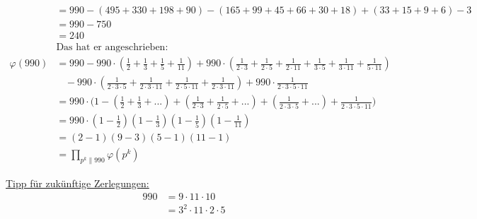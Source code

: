 \documentclass{article} %
\begin{document}
\begin{enumerate}
\begin{mybox}
\begin{align*}
            & = 990 - (495+330+198+90) - (165+99+45+66+30+18)+ (33+15+9+6) - 3 \\
            & = 990 - 750 \\ 
            & = 240 \\
            & \text{Das hat er angeschrieben: }\\
            \varphi(990) & = 990 - 990 \cdot(\frac{1}{2}+\frac{1}{3}+\frac{1}{5}+\frac{1}{11}) + 990 \cdot (\frac{1}{2 \cdot 3}+\frac{1}{2 \cdot 5}+\frac{1}{2 \cdot 11}+\frac{1}{3 \cdot 5}+\frac{1}{3 \cdot 11}+\frac{1}{5 \cdot 11}) \\ & \ \ \ \ - 990 \cdot (\frac{1}{2 \cdot 3 \cdot 5} + \frac{1}{2 \cdot 3 \cdot 11}+\frac{1}{2 \cdot 5 \cdot 11}+\frac{1}{2 \cdot 3 \cdot 11}) + 990 \cdot \frac{1}{2 \cdot 3 \cdot 5 \cdot 11} \\
            & = 990 \cdot \big( 1 - (\frac{1}{2}+\frac{1}{3} + ...) + (\frac{1}{2 \cdot 3}+\frac{1}{2 \cdot 5}+...) +(\frac{1}{2 \cdot 3 \cdot 5} + ...) +   \frac{1}{2 \cdot 3 \cdot 5 \cdot 11}\big)  \\
            & = 990 \cdot (1- \frac{1}{2})(1- \frac{1}{3})(1- \frac{1}{5})(1- \frac{1}{11}) \\
            & = (2-1)(9-3)(5-1)(11-1) \\
            & = \prod_{p^k \| 990} \varphi(p^k)
        \end{align*}
        \end{mybox}
        \begin{mybox}
         \color{Blue}
        \underline{Tipp für zukünftige Zerlegungen:}
        \begin{align*}
            990 & = 9 \cdot 11 \cdot 10 \\
             & = 3^2 \cdot 11 \cdot 2 \cdot 5
        \end{align*}
        \end{mybox}
    \end{enumerate}
\end{document}
